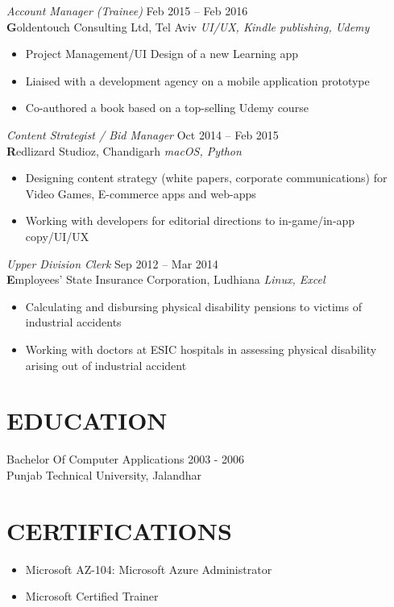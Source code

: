\documentclass[margin, 10pt]{res} %
\begin{document}
\begin{resume}
{\sl Account Manager (Trainee)} \hfill Feb 2015 – Feb 2016 \\
\textbf Goldentouch Consulting Ltd, Tel Aviv \hfill {\scriptsize \it UI/UX, Kindle publishing, Udemy} 
\begin{itemize}\smallskip\smallskip
\item Project Management/UI Design of a new Learning app
\item Liaised with a development agency on a mobile application prototype
\item Co-authored a book based on a top-selling Udemy course
\end{itemize}

{\sl Content Strategist / Bid Manager} \hfill Oct 2014 – Feb 2015 \\
\textbf Redlizard Studioz, Chandigarh \hfill {\scriptsize \it macOS, Python}
\begin{itemize}\smallskip\smallskip
\item Designing content strategy (white papers, corporate communications) for Video Games, E-commerce apps and web-apps
\item Working with developers for editorial directions to in-game/in-app copy/UI/UX
\end{itemize}

{\sl Upper Division Clerk} \hfill Sep 2012 – Mar 2014 \\
\textbf Employees' State Insurance Corporation, Ludhiana \hfill {\scriptsize \it Linux, Excel}
\begin{itemize}\smallskip\smallskip
\item Calculating and disbursing physical disability pensions to victims of industrial accidents
\item Working with doctors at ESIC hospitals in assessing physical disability arising out of industrial accident 
\end{itemize} 

\section{\ttfamily EDUCATION}
Bachelor Of Computer Applications \hfill 2003 - 2006 \\
Punjab Technical University, Jalandhar 
\section{\ttfamily CERTIFICATIONS}
\begin{itemize}
\item Microsoft AZ-104: Microsoft Azure Administrator 
\item Microsoft Certified Trainer
\end{itemize}

\end{resume}
\end{document}

